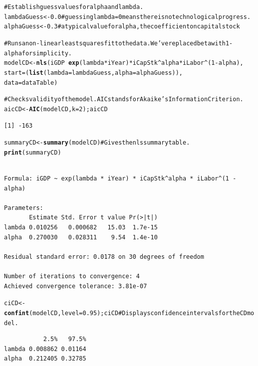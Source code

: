 \documentclass[10pt]{article}\usepackage{graphicx, color}
\makeatletter
\newcommand{\hlfunctioncall}[1]{\textcolor[rgb]{0.501960784313725,0,0.329411764705882}{\textbf{#1}}}%
\newcommand{\hlcomment}[1]{\textcolor[rgb]{0.180392156862745,0.6,0.341176470588235}{#1}}%
\newenvironment{kframe}{%
 \def\at@end@of@kframe{}%
 \ifinner\ifhmode%
  \def\at@end@of@kframe{\end{minipage}}%
  \begin{minipage}{\columnwidth}%
 \fi\fi%
 \def\FrameCommand##1{\hskip\@totalleftmargin \hskip-\fboxsep
 \colorbox{shadecolor}{##1}\hskip-\fboxsep
     \hskip-\linewidth \hskip-\@totalleftmargin \hskip\columnwidth}%
 \MakeFramed {\advance\hsize-\width
   \@totalleftmargin\z@ \linewidth\hsize
   \@setminipage}}%
 {\par\unskip\endMakeFramed%
 \at@end@of@kframe}
\newenvironment{knitrout}{}{} %
\makeatother
\begin{document}
\begin{knitrout}
\color{fgcolor}\begin{kframe}
\begin{alltt}
\hlcomment{# Establish guess values for alpha and lambda.}
lambdaGuess <- 0.0 \hlcomment{# guessing lambda = 0 means there is no technological progress.}
alphaGuess <- 0.3 \hlcomment{# a typical value for alpha, the coefficient on capital stock}

\hlcomment{# Runs a non-linear least squares fit to the data. We've replaced beta with 1-alpha for simplicity.}
modelCD <- \hlfunctioncall{nls}(iGDP ~ \hlfunctioncall{exp}(lambda*iYear) * iCapStk^alpha * iLabor^(1 - alpha), 
               start=(\hlfunctioncall{list}(lambda=lambdaGuess,alpha=alphaGuess)),
               data=dataTable)

\hlcomment{# Checks validity of the model. AIC stands for Akaike's Information Criterion.}
aicCD  <- \hlfunctioncall{AIC}(modelCD, k=2); aicCD
\end{alltt}
\begin{verbatim}
[1] -163
\end{verbatim}
\begin{alltt}

summaryCD <- \hlfunctioncall{summary}(modelCD) \hlcomment{# Gives the nls summary table.}
\hlfunctioncall{print}(summaryCD)
\end{alltt}
\begin{verbatim}

Formula: iGDP ~ exp(lambda * iYear) * iCapStk^alpha * iLabor^(1 - alpha)

Parameters:
       Estimate Std. Error t value Pr(>|t|)
lambda 0.010256   0.000682   15.03  1.7e-15
alpha  0.270030   0.028311    9.54  1.4e-10

Residual standard error: 0.0178 on 30 degrees of freedom

Number of iterations to convergence: 4 
Achieved convergence tolerance: 3.81e-07 
\end{verbatim}
\begin{alltt}
ciCD <- \hlfunctioncall{confint}(modelCD, level = 0.95); ciCD \hlcomment{# Displays confidence intervals for the CD model.}
\end{alltt}


{\ttfamily\noindent\itshape\color{messagecolor}{Waiting for profiling to be done...}}\begin{verbatim}
           2.5%   97.5%
lambda 0.008862 0.01164
alpha  0.212405 0.32785
\end{verbatim}
\begin{alltt}


\end{alltt}
\end{kframe}
\end{knitrout}
\end{document}
